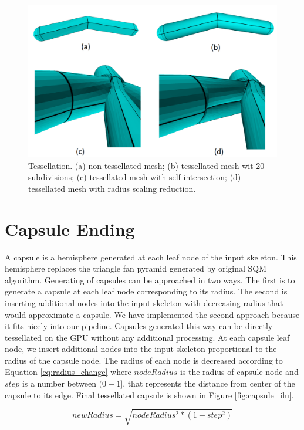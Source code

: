 \begin{figure}[ht]
    \centering
    \includegraphics[width=0.9\linewidth]{images/tess_ilu}
    \caption[Tessellation and smoothing]{Tessellation. (a) non-tessellated mesh; (b) tessellated mesh wit 20 subdivisions; (c) tessellated mesh with self intersection; (d) tessellated mesh with radius scaling reduction.}
    \label{fig:tessellation_ilu}
\end{figure}

\section{Capsule Ending}
A capsule is a hemisphere generated at each leaf node of the input skeleton.
This hemisphere replaces the triangle fan pyramid generated by original SQM algorithm.
Generating of capsules can be approached in two ways.
The first is to generate a capsule at each leaf node corresponding to its radius.
The second is inserting additional nodes into the input skeleton with decreasing radius that would approximate a capsule.
We have implemented the second approach because it fits nicely into our pipeline.
Capsules generated this way can be directly tessellated on the GPU without any additional processing.
At each capsule leaf node, we insert additional nodes into the input skeleton proportional to the radius of the capsule node.
The radius of each node is decreased according to Equation \ref{eq:radius_change} where $nodeRadius$ is the radius of capsule node and $step$ is a number between $(0-1]$, that represents the distance from center of the capsule to its edge.
Final tessellated capsule is shown in Figure \ref{fig:capsule_ilu}.

\begin{equation}
newRadius = \sqrt{nodeRadius^{2} * (1 - step^{2})}
\label{eq:radius_change}
\end{equation}

